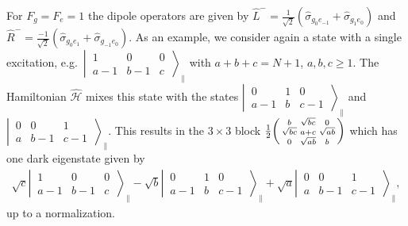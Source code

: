 \documentclass[aps,prx,superscriptaddress,twocolumn,notitlepage,nofootinbib,longbibliography]{revtex4-2}
\begin{document}
For $F_g=F_e=1$ the dipole operators are given by $\hat{L}^-=\frac{1}{\sqrt{2}} ( \hat{\sigma}_{g_{0}e_{-1}} + \hat{\sigma}_{g_{1}e_{0}} )$ and $\hat{R}^-=\frac{-1}{\sqrt{2}} ( \hat{\sigma}_{g_{0}e_{1}} + \hat{\sigma}_{g_{-1}e_{0}} )$.
As an example, we consider again a state with a single excitation, e.g.~$\left|\, \begin{smallmatrix} 1 & 0 & 0 \\  a-1 & b-1 & c  \end{smallmatrix} \,\right\rangle_\parallel$ with $a+b+c=N+1$, $a,b,c\geq1$.
The Hamiltonian $\hat{\mathcal{H}}$ mixes this state with the states $\left|\, \begin{smallmatrix} 0 & 1 & 0 \\  a-1 & b & c-1  \end{smallmatrix} \,\right\rangle_\parallel$ and $\left|\, \begin{smallmatrix} 0 & 0 & 1 \\  a & b-1 & c-1  \end{smallmatrix} \,\right\rangle_\parallel$. This results in the $3\times3$ block $\frac{1}{2} \begin{psmallmatrix} b & \sqrt{bc} & 0 \\  \sqrt{bc} & a+c & \sqrt{ab} \\ 0 & \sqrt{ab} & b  \end{psmallmatrix}$ which has one dark eigenstate given by
\begin{align}
	\sqrt{c} \left|\, \begin{smallmatrix} 1 & 0 & 0 \\  a-1 & b-1 & c  \end{smallmatrix} \,\right\rangle_\parallel - \sqrt{b} \left|\, \begin{smallmatrix} 0 & 1 & 0 \\  a-1 & b & c-1  \end{smallmatrix} \,\right\rangle_\parallel + \sqrt{a} \left|\, \begin{smallmatrix} 0 & 0 & 1 \\  a & b-1 & c-1  \end{smallmatrix} \,\right\rangle_\parallel,
\end{align}
up to a normalization.
\end{document}
